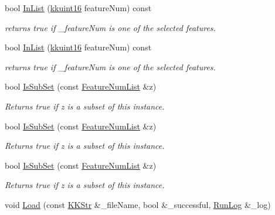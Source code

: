 \begin{DoxyCompactItemize}
bool \hyperlink{class_k_k_m_l_l_1_1_feature_num_list_a9f6b822bb8fe39d4ce0e6983e7299b0f}{In\+List} (\hyperlink{namespace_k_k_b_aa8c7d4d30381c8a0b6fce68974a9c8a9}{kkuint16} feature\+Num) const 
\begin{DoxyCompactList}\small\item\em returns true if \textquotesingle{}\+\_\+feature\+Num\textquotesingle{} is one of the selected features. \end{DoxyCompactList}\item 
bool \hyperlink{class_k_k_m_l_l_1_1_feature_num_list_a9f6b822bb8fe39d4ce0e6983e7299b0f}{In\+List} (\hyperlink{namespace_k_k_b_aa8c7d4d30381c8a0b6fce68974a9c8a9}{kkuint16} feature\+Num) const 
\begin{DoxyCompactList}\small\item\em returns true if \textquotesingle{}\+\_\+feature\+Num\textquotesingle{} is one of the selected features. \end{DoxyCompactList}\item 
bool \hyperlink{class_k_k_m_l_l_1_1_feature_num_list_a713173e1ea194ed56ac6df78e0b1b038}{Is\+Sub\+Set} (const \hyperlink{class_k_k_m_l_l_1_1_feature_num_list}{Feature\+Num\+List} \&z)
\begin{DoxyCompactList}\small\item\em Returns true if \textquotesingle{}z\textquotesingle{} is a subset of this instance. \end{DoxyCompactList}\item 
bool \hyperlink{class_k_k_m_l_l_1_1_feature_num_list_aea36a0e15e3db9a4320216bae79c321e}{Is\+Sub\+Set} (const \hyperlink{class_k_k_m_l_l_1_1_feature_num_list}{Feature\+Num\+List} \&z)
\begin{DoxyCompactList}\small\item\em Returns true if \textquotesingle{}z\textquotesingle{} is a subset of this instance. \end{DoxyCompactList}\item 
bool \hyperlink{class_k_k_m_l_l_1_1_feature_num_list_aea36a0e15e3db9a4320216bae79c321e}{Is\+Sub\+Set} (const \hyperlink{class_k_k_m_l_l_1_1_feature_num_list}{Feature\+Num\+List} \&z)
\begin{DoxyCompactList}\small\item\em Returns true if \textquotesingle{}z\textquotesingle{} is a subset of this instance. \end{DoxyCompactList}\item 
void \hyperlink{class_k_k_m_l_l_1_1_feature_num_list_afd85a6f88ffdcacec07659ee156f8d19}{Load} (const \hyperlink{class_k_k_b_1_1_k_k_str}{K\+K\+Str} \&\+\_\+file\+Name, bool \&\+\_\+successful, \hyperlink{class_k_k_b_1_1_run_log}{Run\+Log} \&\+\_\+log)

\end{DoxyCompactItemize}
